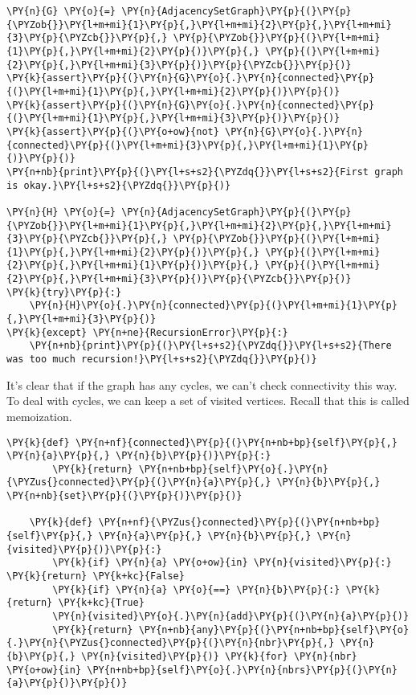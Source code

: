 \begin{Verbatim}[commandchars=\\\{\}]
\PY{n}{G} \PY{o}{=} \PY{n}{AdjacencySetGraph}\PY{p}{(}\PY{p}{\PYZob{}}\PY{l+m+mi}{1}\PY{p}{,}\PY{l+m+mi}{2}\PY{p}{,}\PY{l+m+mi}{3}\PY{p}{\PYZcb{}}\PY{p}{,} \PY{p}{\PYZob{}}\PY{p}{(}\PY{l+m+mi}{1}\PY{p}{,}\PY{l+m+mi}{2}\PY{p}{)}\PY{p}{,} \PY{p}{(}\PY{l+m+mi}{2}\PY{p}{,}\PY{l+m+mi}{3}\PY{p}{)}\PY{p}{\PYZcb{}}\PY{p}{)}
\PY{k}{assert}\PY{p}{(}\PY{n}{G}\PY{o}{.}\PY{n}{connected}\PY{p}{(}\PY{l+m+mi}{1}\PY{p}{,}\PY{l+m+mi}{2}\PY{p}{)}\PY{p}{)}
\PY{k}{assert}\PY{p}{(}\PY{n}{G}\PY{o}{.}\PY{n}{connected}\PY{p}{(}\PY{l+m+mi}{1}\PY{p}{,}\PY{l+m+mi}{3}\PY{p}{)}\PY{p}{)}
\PY{k}{assert}\PY{p}{(}\PY{o+ow}{not} \PY{n}{G}\PY{o}{.}\PY{n}{connected}\PY{p}{(}\PY{l+m+mi}{3}\PY{p}{,}\PY{l+m+mi}{1}\PY{p}{)}\PY{p}{)}
\PY{n+nb}{print}\PY{p}{(}\PY{l+s+s2}{\PYZdq{}}\PY{l+s+s2}{First graph is okay.}\PY{l+s+s2}{\PYZdq{}}\PY{p}{)}

\PY{n}{H} \PY{o}{=} \PY{n}{AdjacencySetGraph}\PY{p}{(}\PY{p}{\PYZob{}}\PY{l+m+mi}{1}\PY{p}{,}\PY{l+m+mi}{2}\PY{p}{,}\PY{l+m+mi}{3}\PY{p}{\PYZcb{}}\PY{p}{,} \PY{p}{\PYZob{}}\PY{p}{(}\PY{l+m+mi}{1}\PY{p}{,}\PY{l+m+mi}{2}\PY{p}{)}\PY{p}{,} \PY{p}{(}\PY{l+m+mi}{2}\PY{p}{,}\PY{l+m+mi}{1}\PY{p}{)}\PY{p}{,} \PY{p}{(}\PY{l+m+mi}{2}\PY{p}{,}\PY{l+m+mi}{3}\PY{p}{)}\PY{p}{\PYZcb{}}\PY{p}{)}
\PY{k}{try}\PY{p}{:}
    \PY{n}{H}\PY{o}{.}\PY{n}{connected}\PY{p}{(}\PY{l+m+mi}{1}\PY{p}{,}\PY{l+m+mi}{3}\PY{p}{)}
\PY{k}{except} \PY{n+ne}{RecursionError}\PY{p}{:}
    \PY{n+nb}{print}\PY{p}{(}\PY{l+s+s2}{\PYZdq{}}\PY{l+s+s2}{There was too much recursion!}\PY{l+s+s2}{\PYZdq{}}\PY{p}{)}
\end{Verbatim}



It's clear that if the graph has any cycles, we can't check connectivity this way.  To deal with cycles, we can keep a set of visited vertices.  Recall that this is called memoization.

\begin{Verbatim}[commandchars=\\\{\}]
    \PY{k}{def} \PY{n+nf}{connected}\PY{p}{(}\PY{n+nb+bp}{self}\PY{p}{,} \PY{n}{a}\PY{p}{,} \PY{n}{b}\PY{p}{)}\PY{p}{:}
        \PY{k}{return} \PY{n+nb+bp}{self}\PY{o}{.}\PY{n}{\PYZus{}connected}\PY{p}{(}\PY{n}{a}\PY{p}{,} \PY{n}{b}\PY{p}{,} \PY{n+nb}{set}\PY{p}{(}\PY{p}{)}\PY{p}{)}

    \PY{k}{def} \PY{n+nf}{\PYZus{}connected}\PY{p}{(}\PY{n+nb+bp}{self}\PY{p}{,} \PY{n}{a}\PY{p}{,} \PY{n}{b}\PY{p}{,} \PY{n}{visited}\PY{p}{)}\PY{p}{:}
        \PY{k}{if} \PY{n}{a} \PY{o+ow}{in} \PY{n}{visited}\PY{p}{:} \PY{k}{return} \PY{k+kc}{False}
        \PY{k}{if} \PY{n}{a} \PY{o}{==} \PY{n}{b}\PY{p}{:} \PY{k}{return} \PY{k+kc}{True}
        \PY{n}{visited}\PY{o}{.}\PY{n}{add}\PY{p}{(}\PY{n}{a}\PY{p}{)}
        \PY{k}{return} \PY{n+nb}{any}\PY{p}{(}\PY{n+nb+bp}{self}\PY{o}{.}\PY{n}{\PYZus{}connected}\PY{p}{(}\PY{n}{nbr}\PY{p}{,} \PY{n}{b}\PY{p}{,} \PY{n}{visited}\PY{p}{)} \PY{k}{for} \PY{n}{nbr} \PY{o+ow}{in} \PY{n+nb+bp}{self}\PY{o}{.}\PY{n}{nbrs}\PY{p}{(}\PY{n}{a}\PY{p}{)}\PY{p}{)}
\end{Verbatim}



